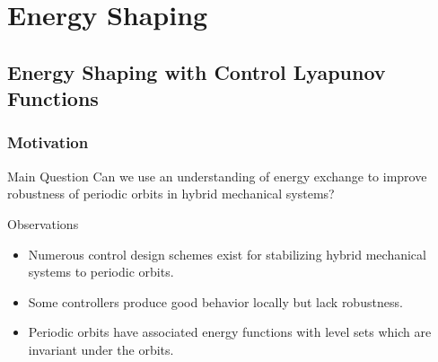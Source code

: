 \section{Energy Shaping}
\showtoc

\subsection{Energy Shaping with Control Lyapunov Functions}

\begin{frame}[t]
  \frametitle{Motivation}
  \begin{block}{Main Question}
    Can we use an understanding of energy exchange to improve robustness  of
    periodic orbits in hybrid mechanical systems?
  \end{block}

  \begin{block}{Observations}
    \begin{itemize}
    \item Numerous control design schemes exist for stabilizing hybrid mechanical
      systems to periodic orbits.
    \item Some controllers produce good behavior locally but lack robustness.
    \item Periodic orbits have associated energy functions with level sets which
      are invariant under the orbits.
    \end{itemize}
  \end{block}
\end{frame}

